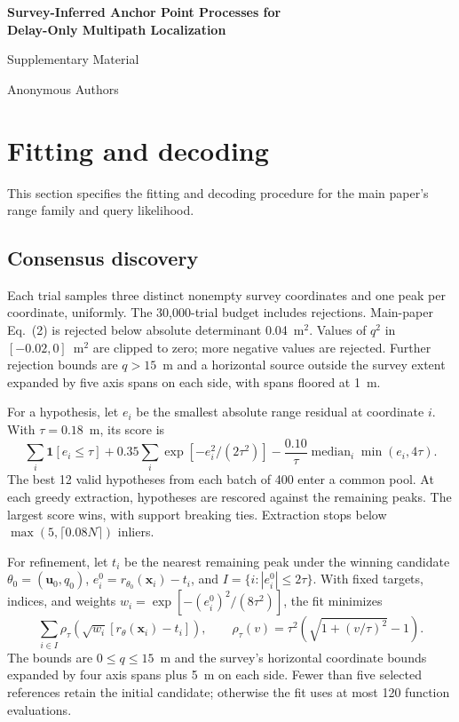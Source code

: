 \documentclass[10pt]{article}
\begin{document}
\begin{center}
{\Large\bfseries Survey-Inferred Anchor Point Processes for\\Delay-Only Multipath Localization}\par\medskip
{\large Supplementary Material}\par\smallskip
Anonymous Authors
\end{center}

\section{Fitting and decoding}
This section specifies the fitting and decoding procedure for the main paper's range family and query likelihood.

\subsection{Consensus discovery}
Each trial samples three distinct nonempty survey coordinates and one peak per coordinate, uniformly. The 30,000-trial budget includes rejections. Main-paper Eq.~(2) is rejected below absolute determinant 0.04~m$^2$. Values of $q^2$ in $[-0.02,0]$~m$^2$ are clipped to zero; more negative values are rejected. Further rejection bounds are $q>15$~m and a horizontal source outside the survey extent expanded by five axis spans on each side, with spans floored at 1~m.

For a hypothesis, let $e_i$ be the smallest absolute range residual at coordinate $i$. With $\tau=0.18$~m, its score is
\begin{equation}
\sum_i\mathbf1[e_i\leq\tau]
+0.35\sum_i\exp[-e_i^2/(2\tau^2)]
-\frac{0.10}{\tau}\operatorname{median}_i\min(e_i,4\tau).
\end{equation}
The best 12 valid hypotheses from each batch of 400 enter a common pool. At each greedy extraction, hypotheses are rescored against the remaining peaks. The largest score wins, with support breaking ties. Extraction stops below $\max(5,\lceil0.08N\rceil)$ inliers.

For refinement, let $t_i$ be the nearest remaining peak under the winning candidate $\theta_0=(\bm u_0,q_0)$, $e_i^0=r_{\theta_0}(\bm x_i)-t_i$, and $I=\{i:|e_i^0|\leq2\tau\}$. With fixed targets, indices, and weights $w_i=\exp[-(e_i^0)^2/(8\tau^2)]$, the fit minimizes
\begin{equation}
\sum_{i\in I}\rho_\tau\!\left(\sqrt{w_i}[r_\theta(\bm x_i)-t_i]\right),
\qquad \rho_\tau(v)=\tau^2\left(\sqrt{1+(v/\tau)^2}-1\right).
\end{equation}
The bounds are $0\leq q\leq15$~m and the survey's horizontal coordinate bounds expanded by four axis spans plus 5~m on each side. Fewer than five selected references retain the initial candidate; otherwise the fit uses at most 120 function evaluations.
\end{document}

